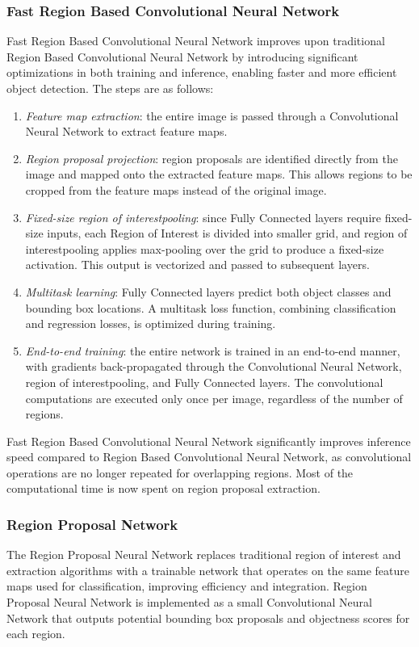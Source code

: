 \subsubsection{Fast Region Based Convolutional Neural Network}
Fast Region Based Convolutional Neural Network improves upon traditional Region Based Convolutional Neural Network by introducing significant optimizations in both training and inference, enabling faster and more efficient object detection.
The steps are as follows: 
\begin{enumerate}
    \item \textit{Feature map extraction}: the entire image is passed through a Convolutional Neural Network to extract feature maps.
    \item \textit{Region proposal projection}: region proposals are identified directly from the image and mapped onto the extracted feature maps. 
        This allows regions to be cropped from the feature maps instead of the original image.
    \item \textit{Fixed-size region of interestpooling}: since Fully Connected layers require fixed-size inputs, each Region of Interest is divided into smaller grid, and region of interestpooling applies max-pooling over the grid to produce a fixed-size activation. 
        This output is vectorized and passed to subsequent layers.
    \item \textit{Multitask learning}: Fully Connected layers predict both object classes and bounding box locations.
        A multitask loss function, combining classification and regression losses, is optimized during training.
    \item \textit{End-to-end training}: the entire network is trained in an end-to-end manner, with gradients back-propagated through the Convolutional Neural Network, region of interestpooling, and Fully Connected layers.
        The convolutional computations are executed only once per image, regardless of the number of regions.
\end{enumerate}
Fast Region Based Convolutional Neural Network significantly improves inference speed compared to Region Based Convolutional Neural Network, as convolutional operations are no longer repeated for overlapping regions.
Most of the computational time is now spent on region proposal extraction. 

\subsubsection{Region Proposal Network}
The Region Proposal Neural Network replaces traditional region of interest and extraction algorithms with a trainable network that operates on the same feature maps used for classification, improving efficiency and integration. 
Region Proposal Neural Network is implemented as a small Convolutional Neural Network that outputs potential bounding box proposals and objectness scores for each region.

